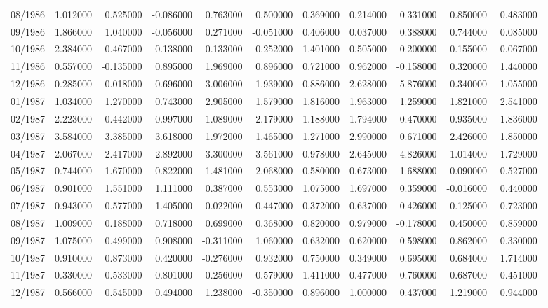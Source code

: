\begin{tabular}{lrrrrrrrrrr}
08/1986 & 1.012000 & 0.525000 & -0.086000 & 0.763000 & 0.500000 & 0.369000 & 0.214000 & 0.331000 & 0.850000 & 0.483000 \\
09/1986 & 1.866000 & 1.040000 & -0.056000 & 0.271000 & -0.051000 & 0.406000 & 0.037000 & 0.388000 & 0.744000 & 0.085000 \\
10/1986 & 2.384000 & 0.467000 & -0.138000 & 0.133000 & 0.252000 & 1.401000 & 0.505000 & 0.200000 & 0.155000 & -0.067000 \\
11/1986 & 0.557000 & -0.135000 & 0.895000 & 1.969000 & 0.896000 & 0.721000 & 0.962000 & -0.158000 & 0.320000 & 1.440000 \\
12/1986 & 0.285000 & -0.018000 & 0.696000 & 3.006000 & 1.939000 & 0.886000 & 2.628000 & 5.876000 & 0.340000 & 1.055000 \\
01/1987 & 1.034000 & 1.270000 & 0.743000 & 2.905000 & 1.579000 & 1.816000 & 1.963000 & 1.259000 & 1.821000 & 2.541000 \\
02/1987 & 2.223000 & 0.442000 & 0.997000 & 1.089000 & 2.179000 & 1.188000 & 1.794000 & 0.470000 & 0.935000 & 1.836000 \\
03/1987 & 3.584000 & 3.385000 & 3.618000 & 1.972000 & 1.465000 & 1.271000 & 2.990000 & 0.671000 & 2.426000 & 1.850000 \\
04/1987 & 2.067000 & 2.417000 & 2.892000 & 3.300000 & 3.561000 & 0.978000 & 2.645000 & 4.826000 & 1.014000 & 1.729000 \\
05/1987 & 0.744000 & 1.670000 & 0.822000 & 1.481000 & 2.068000 & 0.580000 & 0.673000 & 1.688000 & 0.090000 & 0.527000 \\
06/1987 & 0.901000 & 1.551000 & 1.111000 & 0.387000 & 0.553000 & 1.075000 & 1.697000 & 0.359000 & -0.016000 & 0.440000 \\
07/1987 & 0.943000 & 0.577000 & 1.405000 & -0.022000 & 0.447000 & 0.372000 & 0.637000 & 0.426000 & -0.125000 & 0.723000 \\
08/1987 & 1.009000 & 0.188000 & 0.718000 & 0.699000 & 0.368000 & 0.820000 & 0.979000 & -0.178000 & 0.450000 & 0.859000 \\
09/1987 & 1.075000 & 0.499000 & 0.908000 & -0.311000 & 1.060000 & 0.632000 & 0.620000 & 0.598000 & 0.862000 & 0.330000 \\
10/1987 & 0.910000 & 0.873000 & 0.420000 & -0.276000 & 0.932000 & 0.750000 & 0.349000 & 0.695000 & 0.684000 & 1.714000 \\
11/1987 & 0.330000 & 0.533000 & 0.801000 & 0.256000 & -0.579000 & 1.411000 & 0.477000 & 0.760000 & 0.687000 & 0.451000 \\
12/1987 & 0.566000 & 0.545000 & 0.494000 & 1.238000 & -0.350000 & 0.896000 & 1.000000 & 0.437000 & 1.219000 & 0.944000 \\

\end{tabular}
